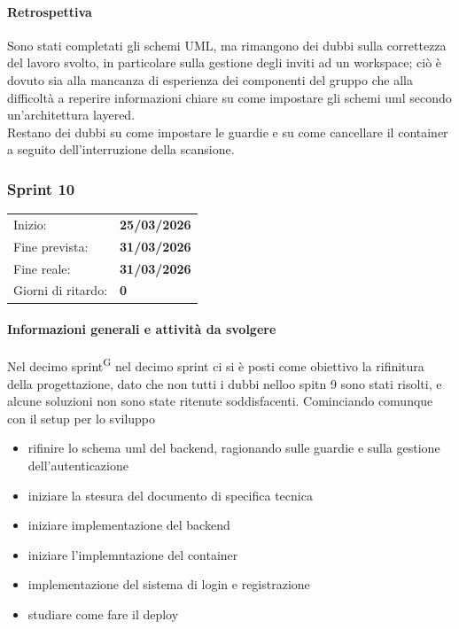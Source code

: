 \documentclass[a4paper, 11pt]{article}
\newcommand{\subsubsubsection}[1]{\paragraph{#1}}
\begin{document}
\subsubsubsection{Retrospettiva}
Sono stati completati gli schemi UML, ma rimangono dei dubbi sulla correttezza del lavoro svolto, in particolare sulla gestione degli inviti ad un workspace; ciò è dovuto sia alla mancanza di esperienza dei componenti del gruppo che alla difficoltà a reperire informazioni chiare su come impostare gli schemi uml secondo un'architettura layered. \\
Restano dei dubbi su come impostare le guardie e su come cancellare il container a seguito dell'interruzione della scansione.\\









\newpage

\subsubsection{Sprint 10}
\begin{tabular}{ll}
	Inizio: & \textbf{25/03/2026} \\
	Fine prevista: & \textbf{31/03/2026} \\
	Fine reale: & \textbf{31/03/2026} \\
	Giorni di ritardo: & \textbf{0} \\
\end{tabular}

\subsubsubsection{Informazioni generali e attività da svolgere}
Nel decimo sprint\textsuperscript{G} nel decimo sprint ci si è posti come obiettivo la rifinitura della progettazione, dato che non tutti i dubbi nelloo spitn 9 sono stati risolti, e alcune soluzioni non sono state ritenute soddisfacenti. Cominciando comunque con il setup per lo sviluppo\\
\begin{itemize}
  \item rifinire lo schema uml del backend, ragionando sulle guardie e sulla gestione dell'autenticazione
  \item iniziare la stesura del documento di specifica tecnica
  \item iniziare implementazione del backend
  \item iniziare l'implemntazione del container
  \item implementazione del sistema di login e registrazione
  \item studiare come fare il deploy
\end{itemize}
\end{document}

